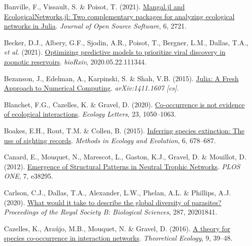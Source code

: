 \documentclass[10pt,oneside]{article}
\newlength{\cslhangindent}
\newenvironment{CSLReferences}[3] %
 {%
  \setlength{\parindent}{0pt}
  \ifodd #1 \everypar{\setlength{\hangindent}{\cslhangindent}}\ignorespaces\fi
  \ifnum #2 > 0
  \setlength{\parskip}{#2\baselineskip}
  \fi
 }%
 {}
\begin{document}
\hypertarget{refs}{}
\begin{CSLReferences}{1}{0}
\leavevmode{}%
Banville, F., Vissault, S. \& Poisot, T. (2021).
\href{https://doi.org/10.21105/joss.02721}{Mangal.jl and
EcologicalNetworks.jl: Two complementary packages for analyzing
ecological networks in Julia}. \emph{Journal of Open Source Software},
6, 2721.

\leavevmode{}%
Becker, D.J., Albery, G.F., Sjodin, A.R., Poisot, T., Bergner, L.M.,
Dallas, T.A., \emph{et al.} (2021).
\href{https://doi.org/10.1101/2020.05.22.111344}{Optimizing predictive
models to prioritize viral discovery in zoonotic reservoirs}.
\emph{bioRxiv}, 2020.05.22.111344.

\leavevmode{}%
Bezanson, J., Edelman, A., Karpinski, S. \& Shah, V.B. (2015).
\href{https://arxiv.org/abs/1411.1607}{Julia: A Fresh Approach to
Numerical Computing}. \emph{arXiv:1411.1607 {[}cs{]}}.

\leavevmode{}%
Blanchet, F.G., Cazelles, K. \& Gravel, D. (2020).
\href{https://doi.org/10.1111/ele.13525}{Co-occurrence is not evidence
of ecological interactions}. \emph{Ecology Letters}, 23, 1050--1063.

\leavevmode{}%
Boakes, E.H., Rout, T.M. \& Collen, B. (2015).
\href{https://doi.org/10.1111/2041-210X.12365}{Inferring species
extinction: The use of sighting records}. \emph{Methods in Ecology and
Evolution}, 6, 678--687.

\leavevmode{}%
Canard, E., Mouquet, N., Marescot, L., Gaston, K.J., Gravel, D. \&
Mouillot, D. (2012).
\href{https://doi.org/10.1371/journal.pone.0038295}{Emergence of
Structural Patterns in Neutral Trophic Networks}. \emph{PLOS ONE}, 7,
e38295.

\leavevmode{}%
Carlson, C.J., Dallas, T.A., Alexander, L.W., Phelan, A.L. \& Phillips,
A.J. (2020). \href{https://doi.org/10.1098/rspb.2020.1841}{What would it
take to describe the global diversity of parasites?} \emph{Proceedings
of the Royal Society B: Biological Sciences}, 287, 20201841.

\leavevmode{}%
Cazelles, K., Araújo, M.B., Mouquet, N. \& Gravel, D. (2016).
\href{https://doi.org/10.1007/s12080-015-0281-9}{A theory for species
co-occurrence in interaction networks}. \emph{Theoretical Ecology}, 9,
39--48.


\end{CSLReferences}
\end{document}
